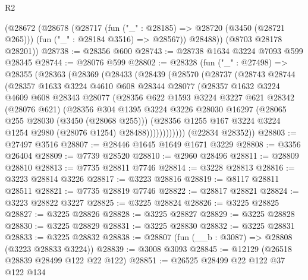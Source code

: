 \begin{lexlean}{R2}
\begin{coremodule}
      (@28672
        (@28678
          (@28717
            (fun ("_" : @28185) => @28720 (@3450 (@28721 @265)))
            (fun ("_" : @28184 @3516) => @28567))
          @28488))
      (@8703 @28178 @28201))
@28738 := @28356 @600
@28743 := @28738 @1634 @3224 @7093 @599 @28345
@28744 := @28076 @599
@28802 := @28328
    (fun ("_" : @27498) =>
    @28355
      (@28363
        (@28369
          (@28433
            (@28439
              (@28570
                (@28737
                  (@28743
                    @28744
                    (@28357
                      @1633
                      @3224
                      @4610
                      @608
                      @28344
                      @28077
                      (@28357
                        @1632
                        @3224
                        @4609
                        @608
                        @28343
                        @28077
                        (@28356
                          @622
                          @1593
                          @3224
                          @3227
                          @621
                          @28342
                          (@28076 @621)
                          (@28356
                            @304
                            @1395
                            @3224
                            @3226
                            @28030
                            @16297
                            (@28065 @255 @28030 (@3450 (@28068 @255)))
                            (@28356
                              @1255
                              @167
                              @3224
                              @3224
                              @1254
                              @2980
                              (@28076 @1254)
                              @28488))))))))))))
      (@22834 @28352))
@28803 := @27497 @3516
@28807 := @28446 @1645 @1649 @1671 @3229
@28808 := @3356 @26404
@28809 := @7739 @28520
@28810 := @2960 @28496
@28811 := @28809 @28810
@28813 := @7735 @28811 @7746
@28814 := @3228 @28813
@28816 := @3223 @28814 @3226
@28817 := @3223 @28816
@28819 := @8117 @28811 @28511
@28821 := @7735 @28819 @7746
@28822 := @28817 @28821
@28824 := @3223 @28822 @3227
@28825 := @3225 @28824
@28826 := @3225 @28825
@28827 := @3225 @28826
@28828 := @3225 @28827
@28829 := @3225 @28828
@28830 := @3225 @28829
@28831 := @3225 @28830
@28832 := @3225 @28831
@28833 := @3225 @28832
@28838 := @28807 (fun (__b : @3087) => @28808 (@3223 @28833 @3224))
@28839 := @3008 @3093
@28845 := @12129 (@26518 @28839 @28499 @122 @22 @122)
@28851 := @26525 @28499 @22 @122 @37 @122 @134

\end{coremodule}
\end{lexlean}
